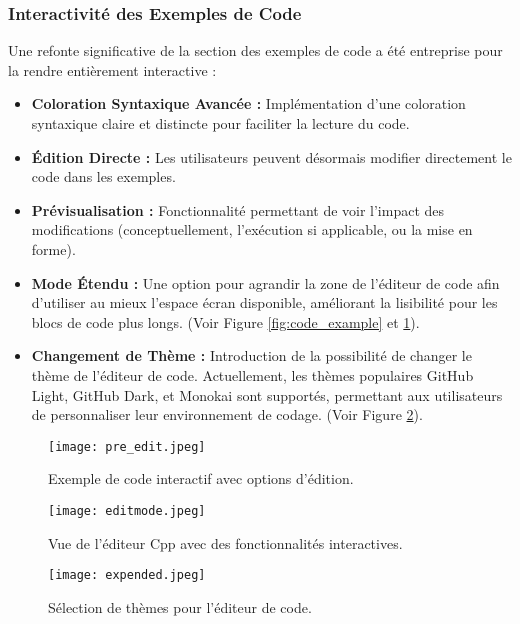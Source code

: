 \documentclass[12pt, a4paper]{article}
\begin{document}
\subsubsection{Interactivité des Exemples de Code}
Une refonte significative de la section des exemples de code a été entreprise pour la rendre entièrement interactive :
\begin{itemize}
    \item \textbf{Coloration Syntaxique Avancée :} Implémentation d'une coloration syntaxique claire et distincte pour faciliter la lecture du code.
    \item \textbf{Édition Directe :} Les utilisateurs peuvent désormais modifier directement le code dans les exemples.
    \item \textbf{Prévisualisation :} Fonctionnalité permettant de voir l'impact des modifications (conceptuellement, l'exécution si applicable, ou la mise en forme).
    \item \textbf{Mode Étendu :} Une option pour agrandir la zone de l'éditeur de code afin d'utiliser au mieux l'espace écran disponible, améliorant la lisibilité pour les blocs de code plus longs. (Voir Figure \ref{fig:code_example} et \ref{fig:cpp_editor}).
    \item \textbf{Changement de Thème :} Introduction de la possibilité de changer le thème de l'éditeur de code. Actuellement, les thèmes populaires GitHub Light, GitHub Dark, et Monokai sont supportés, permettant aux utilisateurs de personnaliser leur environnement de codage. (Voir Figure \ref{fig:theme_selection}).
\end{itemize}

\begin{figure}[htbp]
  \centering
  \begin{minipage}{0.48\textwidth}
    \centering
    \texttt{[image: pre\_edit.jpeg]} %
    \caption{Exemple de code interactif avec options d'édition.}
    \label{fig:code_example}
  \end{minipage}\hfill
  \begin{minipage}{0.48\textwidth}
    \centering
    \texttt{[image: editmode.jpeg]} %
    \caption{Vue de l'éditeur Cpp avec des fonctionnalités interactives.}
    \label{fig:cpp_editor}
  \end{minipage}
\end{figure}

\begin{figure}[htbp]
  \centering
  \texttt{[image: expended.jpeg]} %
  \caption{Sélection de thèmes pour l'éditeur de code.}
  \label{fig:theme_selection}
\end{figure}
\end{document}
